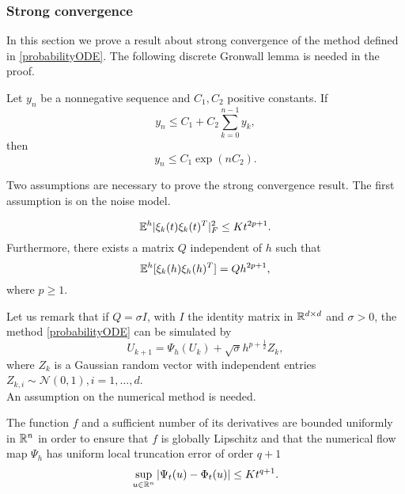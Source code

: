 \subsubsection{Strong convergence}

In this section we prove a result about strong convergence of the method defined in \eqref{probabilityODE}. The following discrete Gronwall lemma is needed in the proof. 
\begin{theorem}\label{thm:Gronwall} Let $y_n$ be a nonnegative sequence and $C_1, C_2$ positive constants. If
\begin{equation}
	y_n \leq C_1 + C_2 \sum_{k=0}^{n-1} y_k,
\end{equation}
then 
\begin{equation}
	y_n \leq C_1 \exp(nC_2).
\end{equation}
\end{theorem}
\noindent Two assumptions are necessary to prove the strong convergence result. The first assumption is on the noise model.
\begin{assumption}\label{assumption_1}
\begin{equation}
	\mathbb{E}^h|\xi_k(t)\xi_k(t)^T|^2_F \leq Kt^{2p+1}.
\end{equation}
Furthermore, there exists a matrix $Q$ independent of $h$ such that 
\begin{equation}
	\mathbb{E}^h[\xi_k(h)\xi_h(h)^T] = Qh^{2p+1},
\end{equation}
where $p\geq 1$.
\end{assumption}
\noindent Let us remark that if $Q = \sigma I$, with $I$ the identity matrix in $\mathbb{R}^{d\times d}$ and $\sigma > 0$, the method \eqref{probabilityODE} can be simulated by
\begin{equation}
	U_{k+1} = \Psi_h(U_k) + \sqrt{\sigma} h^{p + \frac{1}{2}} Z_k,
\end{equation}
where $Z_k$ is a Gaussian random vector with independent entries $Z_{k,i}  \sim\mathcal{N}(0,1), i = 1, \ldots, d$. \\
An assumption on the numerical method is needed.
\begin{assumption}\label{assumption_2}  The function $f$ and a sufficient number of its derivatives are bounded uniformly in $\mathbb{R}^n$ in order to ensure that $f$ is globally Lipschitz and that the numerical flow map $\Psi_h$ has uniform local truncation error of order $q + 1$
\begin{equation}
	\sup_{u\in\mathbb{R}^n} |\Psi_t(u) - \Phi_t(u)| \leq Kt^{q+1}.
\end{equation}
\end{assumption}
